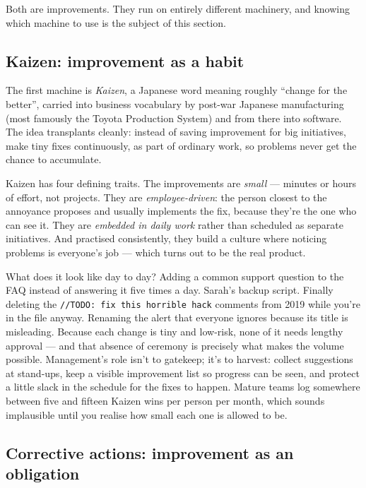 Both are improvements. They run on entirely different machinery, and knowing which machine to use is the subject of this section.



\subsection{Kaizen: improvement as a habit}


The first machine is \emph{Kaizen}, a Japanese word meaning roughly ``change for the better'', carried into business vocabulary by post-war Japanese manufacturing (most famously the Toyota Production System) and from there into software. The idea transplants cleanly: instead of saving improvement for big initiatives, make tiny fixes continuously, as part of ordinary work, so problems never get the chance to accumulate.


Kaizen has four defining traits. The improvements are \emph{small} — minutes or hours of effort, not projects. They are \emph{employee-driven}: the person closest to the annoyance proposes and usually implements the fix, because they're the one who can see it. They are \emph{embedded in daily work} rather than scheduled as separate initiatives. And practised consistently, they build a culture where noticing problems is everyone's job — which turns out to be the real product.


What does it look like day to day? Adding a common support question to the FAQ instead of answering it five times a day. Sarah's backup script. Finally deleting the \texttt{//TODO: fix this horrible hack} comments from 2019 while you're in the file anyway. Renaming the alert that everyone ignores because its title is misleading. Because each change is tiny and low-risk, none of it needs lengthy approval — and that absence of ceremony is precisely what makes the volume possible. Management's role isn't to gatekeep; it's to harvest: collect suggestions at stand-ups, keep a visible improvement list so progress can be seen, and protect a little slack in the schedule for the fixes to happen. Mature teams log somewhere between five and fifteen Kaizen wins per person per month, which sounds implausible until you realise how small each one is allowed to be.



\subsection{Corrective actions: improvement as an obligation}



